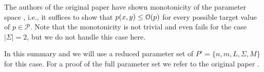 The authors of the original paper have shown monotonicity of the parameter space \cite[section 4.2]{Bringman.2018}, i.e., it suffices to show that $p(x,y) \leq \mathcal{O}(p)$ for every possible target value of $p \in \mathcal{P}$.
Note that the monotonicity is not trivial and even fails for the case $|\Sigma| = 2$, but we do not handle this case here.


In this summary and we will use a reduced parameter set of $P' = \{n, m, L, \Sigma, M\}$ for this case.
For a proof of the full parameter set we refer to the original paper \cite[section 9.1.2]{Bringman.2018}.

